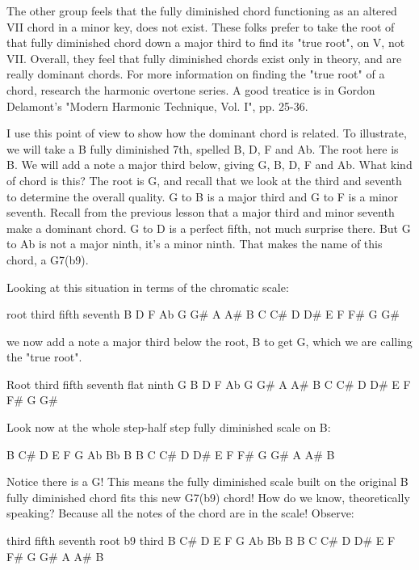 The other group feels that the fully diminished chord functioning as an
altered VII chord in a minor key, does not exist. These folks prefer to take
the root of that fully diminished chord down a major third to find its "true
root", on V, not VII. Overall, they feel that fully diminished chords exist
only in theory, and are really dominant chords. For more information on
finding the "true root" of a chord, research the harmonic overtone series.
A good treatice is in Gordon Delamont's "Modern Harmonic Technique, Vol. I",
pp. 25-36.

I use this point of view to show how the dominant chord is related. To
illustrate, we will take a B fully diminished 7th, spelled B, D, F and Ab. The
root here is B. We will add a note a major third below, giving G, B, D, F and
Ab. What kind of chord is this? The root is G, and recall that we look at the
third and seventh to determine the overall quality. G to B is a major third and
G to F is a minor seventh. Recall from the previous lesson that a major third
and minor seventh make a dominant chord. G to D is a perfect fifth, not much
surprise there. But G to Ab is not a major ninth, it's a minor ninth. That makes
the name of this chord, a G7(b9).

Looking at this situation in terms of the chromatic scale:

                  root           third          fifth         seventh
                    B              D              F              Ab
G    G\#   A    A\#   B    C    C\#   D    D\#   E    F    F\#   G    G\#

we now add a note a major third below the root, B to get G, which we are
calling the "true root".

Root              third          fifth         seventh        flat ninth
G                   B              D              F              Ab
G    G\#   A    A\#   B    C    C\#   D    D\#   E    F    F\#   G    G\#

Look now at the whole step-half step fully diminished scale on B:

B         C\#   D         E    F         G    Ab        Bb   B
B    C    C\#   D    D\#   E    F    F\#   G    G\#   A    A\#   B

Notice there is a G! This means the fully diminished scale built on the
original B fully diminished chord fits this new G7(b9) chord! How do we
know, theoretically speaking? Because all the notes of the chord are in the
scale! Observe:

third        fifth         seventh    root   b9           third
B         C\#   D         E    F         G    Ab        Bb   B
B    C    C\#   D    D\#   E    F    F\#   G    G\#   A    A\#   B

